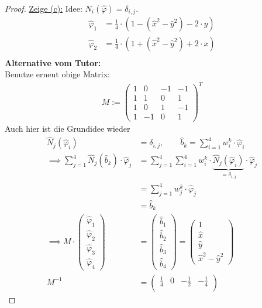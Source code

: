 \documentclass[12pt,a4paper]{article}
\begin{document}
\begin{proof}
\underline{Zeige (c):} 
Idee: $N_i(\hat{\varphi})=\delta_{i,j}$.
\begin{align*}
\hat{\varphi}_1&=\frac{1}{4}\cdot\left(1-\left(\hat{x}^2-\hat{y}^2\right)-2\cdot y\right)\\
\hat{\varphi}_2&=\frac{1}{4}\cdot\left(1+\left(\hat{x}^2-\hat{y}^2\right)+2\cdot x\right)\\
\end{align*}
\textbf{Alternative vom Tutor:}\\
Benutze erneut obige Matrix:
\begin{align*}
M:=\begin{pmatrix}
1 & 0 & -1 & -1\\
1 & 1 & 0 & 1\\
 1 & 0 & 1 & -1\\
 1 & -1 & 0 & 1
\end{pmatrix}^T
\end{align*}
Auch hier ist die Grundidee wieder 
\begin{align*}
\hat{N}_j(\hat{\varphi}_i)&=\delta_{i,j},\qquad
\hat{b}_k=\sum\limits_{i=1}^4 w_i^k\cdot\hat{\varphi}_i\\
\implies
\sum\limits_{j=1}^4\hat{N}_j(\hat{b}_k)\cdot\hat{\varphi}_j
&=\sum\limits_{j=1}^4\sum\limits_{i=1}^4 w_i^k\cdot\underbrace{\hat{N}_j(\hat{\varphi}_i)}_{=\delta_{i,j}}\cdot\hat{\varphi}_j\\
&=\sum\limits_{j=1}^4 w_j^k\cdot\hat{\varphi}_j\\
&=\hat{b}_k\\
\implies
M\cdot\begin{pmatrix}
\hat{\varphi}_1\\ \hat{\varphi}_2 \\ \hat{\varphi}_3 \\ \hat{\varphi}_4
\end{pmatrix}
&=\begin{pmatrix}
\hat{b}_1\\ \hat{b}_2 \\ \hat{b}_3 \\ \hat{b}_4
\end{pmatrix}
=\begin{pmatrix}
1\\ \hat{x} \\ \hat{y} \\\hat{x}^2-\hat{y}^2
\end{pmatrix}\\
M^{-1}&=\begin{pmatrix}
\frac{1}{4} & 0 & -\frac{1}{2} & -\frac{1}{4}\\

\end{pmatrix}
\end{align*}
\end{proof}
\end{document}
